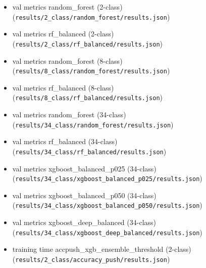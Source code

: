 \begin{itemize}\footnotesize
\item val metrics random\_forest (2-class) (\texttt{results/2\_class/random\_forest/results.json})
\item val metrics rf\_balanced (2-class) (\texttt{results/2\_class/rf\_balanced/results.json})
\item val metrics random\_forest (8-class) (\texttt{results/8\_class/random\_forest/results.json})
\item val metrics rf\_balanced (8-class) (\texttt{results/8\_class/rf\_balanced/results.json})
\item val metrics random\_forest (34-class) (\texttt{results/34\_class/random\_forest/results.json})
\item val metrics rf\_balanced (34-class) (\texttt{results/34\_class/rf\_balanced/results.json})
\item val metrics xgboost\_balanced\_p025 (34-class) (\texttt{results/34\_class/xgboost\_balanced\_p025/results.json})
\item val metrics xgboost\_balanced\_p050 (34-class) (\texttt{results/34\_class/xgboost\_balanced\_p050/results.json})
\item val metrics xgboost\_deep\_balanced (34-class) (\texttt{results/34\_class/xgboost\_deep\_balanced/results.json})
\item training time accpush\_xgb\_ensemble\_threshold (2-class) (\texttt{results/2\_class/accuracy\_push/results.json})
\end{itemize}
